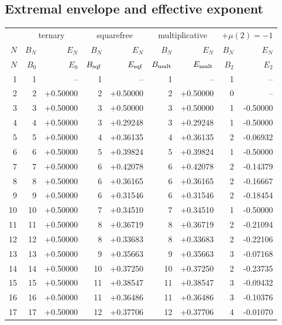 \documentclass[11pt]{article}
\begin{document}
\subsection{Extremal envelope and effective exponent}
\begin{center}\scriptsize\begin{longtable}{r rr rr rr rr}
\toprule & \multicolumn{2}{c}{ternary} & \multicolumn{2}{c}{squarefree} & \multicolumn{2}{c}{multiplicative} & \multicolumn{2}{c}{$+\mu(2)=-1$}\\
$N$ & $B_N$ & $E_N$ & $B_N$ & $E_N$ & $B_N$ & $E_N$ & $B_N$ & $E_N$\\ \midrule\endfirsthead
\toprule $N$ & $B_0$ & $E_0$ & $B_{\rm sqf}$ & $E_{\rm sqf}$ & $B_{\rm mult}$ & $E_{\rm mult}$ & $B_2$ & $E_2$\\ \midrule\endhead
1 & 1 & -- & 1 & -- & 1 & -- & 1 & --\\
2 & 2 & +0.50000 & 2 & +0.50000 & 2 & +0.50000 & 0 & --\\
3 & 3 & +0.50000 & 3 & +0.50000 & 3 & +0.50000 & 1 & -0.50000\\
4 & 4 & +0.50000 & 3 & +0.29248 & 3 & +0.29248 & 1 & -0.50000\\
5 & 5 & +0.50000 & 4 & +0.36135 & 4 & +0.36135 & 2 & -0.06932\\
6 & 6 & +0.50000 & 5 & +0.39824 & 5 & +0.39824 & 1 & -0.50000\\
7 & 7 & +0.50000 & 6 & +0.42078 & 6 & +0.42078 & 2 & -0.14379\\
8 & 8 & +0.50000 & 6 & +0.36165 & 6 & +0.36165 & 2 & -0.16667\\
9 & 9 & +0.50000 & 6 & +0.31546 & 6 & +0.31546 & 2 & -0.18454\\
10 & 10 & +0.50000 & 7 & +0.34510 & 7 & +0.34510 & 1 & -0.50000\\
11 & 11 & +0.50000 & 8 & +0.36719 & 8 & +0.36719 & 2 & -0.21094\\
12 & 12 & +0.50000 & 8 & +0.33683 & 8 & +0.33683 & 2 & -0.22106\\
13 & 13 & +0.50000 & 9 & +0.35663 & 9 & +0.35663 & 3 & -0.07168\\
14 & 14 & +0.50000 & 10 & +0.37250 & 10 & +0.37250 & 2 & -0.23735\\
15 & 15 & +0.50000 & 11 & +0.38547 & 11 & +0.38547 & 3 & -0.09432\\
16 & 16 & +0.50000 & 11 & +0.36486 & 11 & +0.36486 & 3 & -0.10376\\
17 & 17 & +0.50000 & 12 & +0.37706 & 12 & +0.37706 & 4 & -0.01070\\

\end{longtable}
\end{center}
\end{document}
